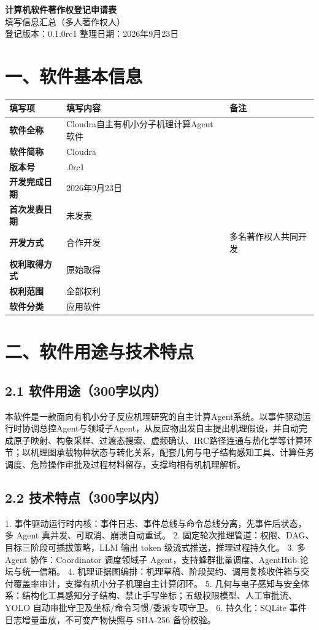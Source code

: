 \documentclass[zihao=-4,a4paper,fontset=none]{ctexart}
\begin{document}
\begin{center}
  {\LARGE\bfseries 计算机软件著作权登记申请表}\\[4pt]
  {\large 填写信息汇总（多人著作权人）}\\[8pt]
  {\small 登记版本：0.1.0rc1 \quad 整理日期：2026年9月23日}
\end{center}

\section*{一、软件基本信息}

\begin{tabular}{>{\bfseries}l>{\raggedright\arraybackslash}p{5.4cm}>{\raggedright\arraybackslash}p{6.4cm}}
  \toprule
  填写项 & 填写内容 & 备注 \\
  \midrule
  软件全称 & Cloudra自主有机小分子机理计算Agent软件 & \\
  软件简称 & Cloudra & \\
  版本号 & 0.1.0rc1 & \\
  开发完成日期 & 2026年9月23日 & \\
  首次发表日期 & 未发表 & \\
  开发方式 & 合作开发 & 多名著作权人共同开发 \\
  权利取得方式 & 原始取得 & \\
  权利范围 & 全部权利 & \\
  软件分类 & 应用软件 & \\
  \bottomrule
\end{tabular}

\section*{二、软件用途与技术特点}

\subsection*{2.1 软件用途（300字以内）}
本软件是一款面向有机小分子反应机理研究的自主计算Agent系统。以事件驱动运行时协调总控Agent与领域子Agent，从反应物出发自主提出机理假设，并自动完成原子映射、构象采样、过渡态搜索、虚频确认、IRC路径连通与热化学等计算环节；以机理图承载物种状态与转化关系，配套几何与电子结构感知工具、计算任务调度、危险操作审批及过程材料留存，支撑均相有机机理解析。

\subsection*{2.2 技术特点（300字以内）}
1. 事件驱动运行时内核：事件日志、事件总线与命令总线分离，先事件后状态，多 Agent 真并发、可取消、崩溃自动重试。
2. 固定轮次推理管道：权限、DAG、目标三阶段可插拔策略，LLM 输出 token 级流式推送，推理过程持久化。
3. 多 Agent 协作：Coordinator 调度领域子 Agent，支持蜂群批量调度、AgentHub 论坛与统一信箱。
4. 机理证据图编排：机理草稿、阶段契约、调用复核收件箱与交付覆盖率审计，支撑有机小分子机理自主计算闭环。
5. 几何与电子感知与安全体系：结构化工具感知分子结构、禁止手写坐标；五级权限模型、人工审批流、YOLO 自动审批守卫及坐标/命令习惯/委派专项守卫。
6. 持久化：SQLite 事件日志增量重放，不可变产物快照与 SHA-256 备份校验。
\end{document}
